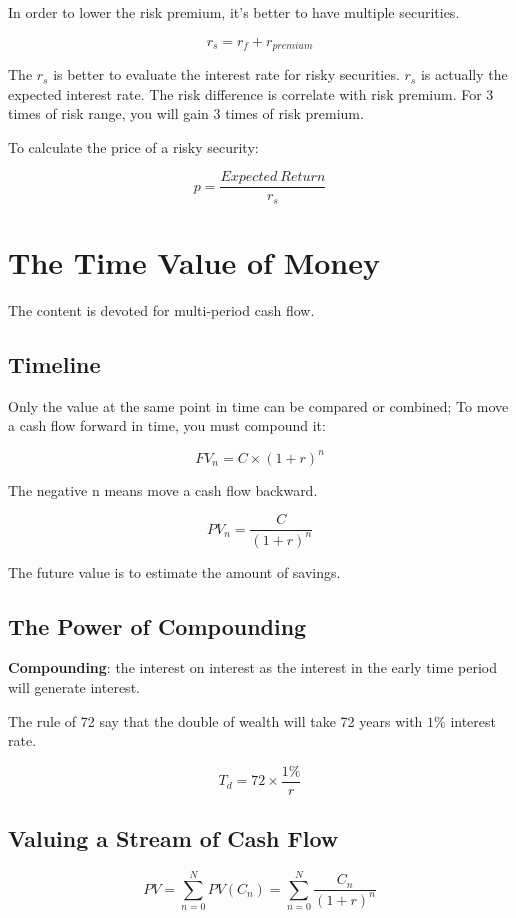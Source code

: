 \documentclass[10pt, a4paper]{article}
\begin{document}
                In order to lower the risk premium, it's better to have multiple securities. 

                $$r_s = r_f + r_{premium}$$

                The $r_s$ is better to evaluate the interest rate for risky securities. $r_s$ is actually the expected interest rate.  The risk difference is correlate with risk premium. For 3 times of risk range, you will gain 3 times of risk premium.

                To calculate the price of a risky security: 

                $$p = \frac{Expected\ Return}{r_s}$$
    \section{The Time Value of Money}
        The content is devoted for multi-period cash flow. 

        \subsection{Timeline}
            Only the value at the same point in time can be compared or combined; To move a cash flow forward in time, you must compound it: 

            $$FV_n = C \times (1 + r) ^ n$$

            The negative n means move a cash flow backward. 

            $$PV_n = \frac{C}{(1 + r)^n}$$

            The future value is to estimate the amount of savings. 
        \subsection{The Power of Compounding}
           \textbf{Compounding}: the interest on interest as the interest in the early time period will generate interest. 

            The rule of 72 say that the double of wealth will take 72 years with $1\%$ interest rate. 

            $$T_d = 72 \times \frac{1\%}{r}$$

        \subsection{Valuing a Stream of Cash Flow}
        
        $$PV = \sum_{n = 0}^{N}PV(C_n) = \sum_{n = 0}^{N}\frac{C_n}{(1 + r)^n}$$
\end{document}
